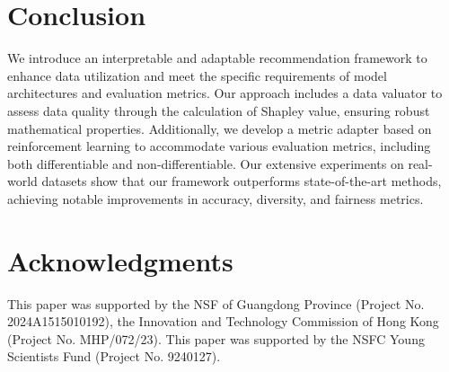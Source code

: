 \section{Conclusion}
We introduce an interpretable and adaptable recommendation framework to enhance data utilization and meet the specific requirements of model architectures and evaluation metrics. Our approach includes a data valuator to assess data quality through the calculation of Shapley value, ensuring robust mathematical properties. 
Additionally, we develop a metric adapter based on reinforcement learning to accommodate various evaluation metrics, including both differentiable and non-differentiable. Our extensive experiments on real-world datasets show that our framework outperforms state-of-the-art methods, achieving notable improvements in accuracy, diversity, and fairness metrics.

\section*{Acknowledgments}
This paper was supported by the NSF of Guangdong Province (Project No. 2024A1515010192), the Innovation and Technology Commission of Hong Kong (Project No. MHP/072/23). This paper was supported by the NSFC Young Scientists Fund (Project No. 9240127).
